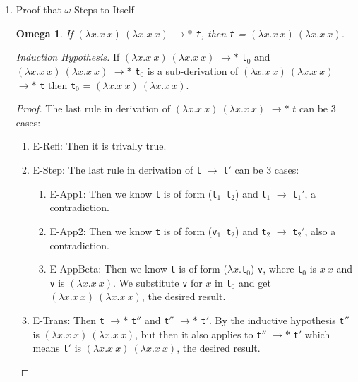 \documentclass{article}
\newtheorem{omg}{Omega}
\begin{document}
\begin{enumerate}
  \item{Proof that $\omega$ Steps to Itself}
    \begin{omg} If $(\lambda x.x\ x)\ (\lambda x.x\ x)$ $\longrightarrow*$ \verb|t|, then \verb|t| = $(\lambda x.x\ x)\ (\lambda x.x\ x)$.
    \end{omg}

    \textit{Induction Hypothesis.} If $(\lambda x.x\ x)\ (\lambda x.x\ x)$ $\longrightarrow*$ \verb|t|$_0$ and $(\lambda x.x\ x)\ (\lambda x.x\ x)$ $\longrightarrow*$ \verb|t|$_0$ is a sub-derivation of $(\lambda x.x\ x)\ (\lambda x.x\ x)$ $\longrightarrow*$ \verb|t| then \verb|t|$_0$ = $(\lambda x.x\ x)\ (\lambda x.x\ x)$.

    \begin{proof}
      The last rule in derivation of $(\lambda x.x\ x)\ (\lambda x.x\ x)$ $\longrightarrow*$ $t$ can be 3 cases:
      \begin{enumerate}
      \item E-Refl: Then it is trivally true.

      \item E-Step:
        The last rule in derivation of \verb|t| $\longrightarrow$ \verb|t|$'$ can be 3 cases:
        \begin{enumerate}
          \item E-App1: Then we know \verb|t| is of form (\verb|t|$_1$\ \verb|t|$_2$) and \verb|t|$_1$ $\longrightarrow$ \verb|t|$_1'$, a contradiction.
          \item E-App2: Then we know \verb|t| is of form (\verb|v|$_1$\ \verb|t|$_2$) and \verb|t|$_2$ $\longrightarrow$ \verb|t|$_2'$, also a contradiction.
          \item E-AppBeta: Then we know \verb|t| is of form ($\lambda x.$\verb|t|$_0$) \verb|v|, where \verb|t|$_0$ is $x\ x$ and \verb|v| is $(\lambda x.x\ x)$. We substitute \verb|v| for $x$ in \verb|t|$_0$ and get $(\lambda x.x\ x)\ (\lambda x.x\ x)$, the desired result.
        \end{enumerate}

      \item E-Trans: Then \verb|t| $\longrightarrow *$ \verb|t|$''$ and \verb|t|$''$ $\longrightarrow *$ \verb|t|$'$. By the inductive hypothesis \verb|t|$''$ is $(\lambda x.x\ x)\ (\lambda x.x\ x)$, but then it also applies to \verb|t|$''$ $\longrightarrow *$ \verb|t|$'$ which means \verb|t|$'$ is $(\lambda x.x\ x)\ (\lambda x.x\ x)$, the desired result.

      \end{enumerate}
    \end{proof}


\end{enumerate}
\end{document}
